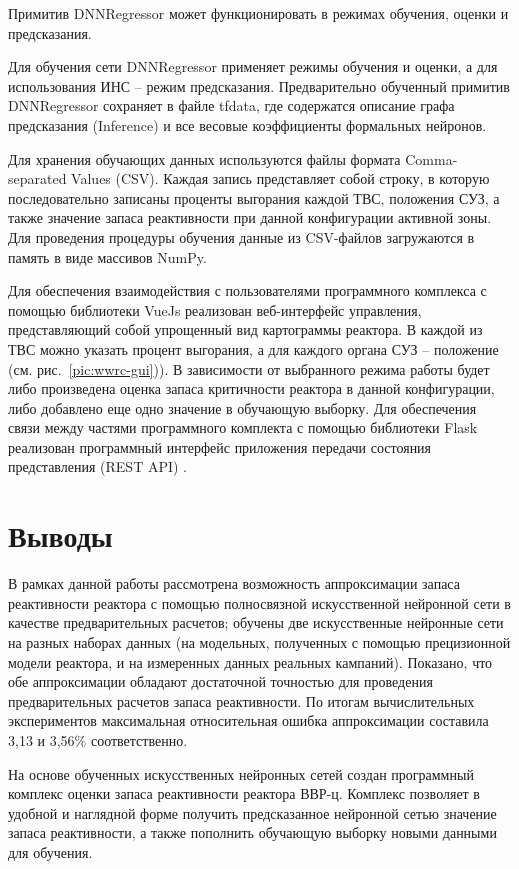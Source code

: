 Примитив DNNRegressor может функционировать в режимах обучения, оценки и
предсказания.

Для обучения сети DNNRegressor применяет режимы обучения и оценки, а для использования ИНС -- режим предсказания.
Предварительно обученный примитив DNNRegressor сохраняет в файле tfdata, где содержатся описание графа предсказания (Inference) и все весовые коэффициенты формальных нейронов.

Для хранения обучающих данных используются файлы формата Comma-separated
Values (CSV).
Каждая запись представляет собой строку, в которую последовательно записаны проценты выгорания каждой ТВС, положения СУЗ, а также значение запаса реактивности при данной конфигурации активной зоны.
Для проведения процедуры обучения данные из CSV-файлов загружаются в память в виде массивов NumPy.

Для обеспечения взаимодействия с пользователями программного комплекса с
помощью библиотеки VueJs реализован веб-интерфейс управления\cite{vuejs,vuejs-2017,vuejs-2016}, представляющий собой упрощенный вид картограммы реактора. В каждой из ТВС можно указать процент выгорания, а для каждого органа СУЗ -- положение (см. рис.~\ref{pic:wwrc-gui})).
В зависимости от выбранного режима работы будет либо произведена оценка запаса критичности реактора в данной конфигурации, либо добавлено еще одно значение в обучающую выборку. 
Для обеспечения связи между частями программного комплекта с помощью библиотеки Flask\cite{flask,flask-2018,flask-2016} реализован программный интерфейс
приложения передачи состояния представления (REST API) \cite{rest-2008,rest-2011}.

\section{Выводы}

В рамках данной работы рассмотрена возможность аппроксимации запаса
реактивности реактора с помощью полносвязной искусственной нейронной
сети в качестве предварительных расчетов; обучены две искусственные
нейронные сети на разных наборах данных (на модельных, полученных с
помощью прецизионной модели реактора, и на измеренных данных реальных
кампаний). Показано, что обе аппроксимации обладают достаточной
точностью для проведения предварительных расчетов запаса реактивности.
По итогам вычислительных экспериментов максимальная относительная ошибка
аппроксимации составила 3,13 и 3,56\% соответственно.

На основе обученных искусственных нейронных сетей создан программный
комплекс оценки запаса реактивности реактора ВВР-ц. Комплекс позволяет в
удобной и наглядной форме получить предсказанное нейронной сетью
значение запаса реактивности, а также пополнить обучающую выборку новыми
данными для обучения.

